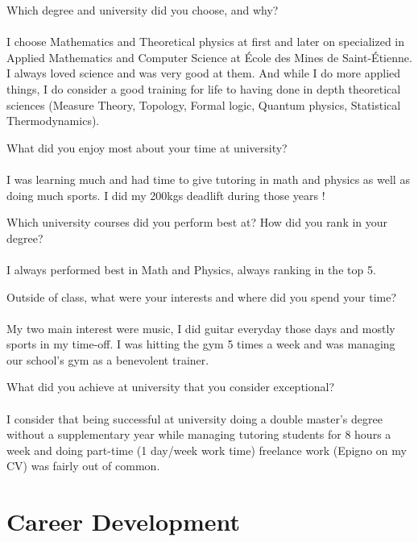 \documentclass{exam}
\begin{document}
\begin{questions}
\question Which degree and university did you choose, and why?
\\~\\
I choose Mathematics and Theoretical physics at first and later on specialized in Applied Mathematics and Computer Science at 
École des Mines de Saint-Étienne. I always loved science and was very good at them. And while I do more applied things, I do consider
a good training for life to having done in depth theoretical sciences (Measure Theory, Topology, Formal logic, Quantum physics, Statistical Thermodynamics).

\question What did you enjoy most about your time at university?
\\~\\
I was learning much and had time to give tutoring in math and physics as well as doing much sports. I did my 200kgs deadlift during those years !

\question Which university courses did you perform best at? How did you rank in your degree?
\\~\\
I always performed best in Math and Physics, always ranking in the top 5.

\question Outside of class, what were your interests and where did you spend your time?
\\~\\
My two main interest were music, I did guitar everyday those days and mostly sports in my time-off. 
I was hitting the gym 5 times a week and was managing our school's gym as a benevolent trainer.

\question What did you achieve at university that you consider exceptional?
\\~\\
I consider that being successful at university doing a double master's degree 
without a supplementary year while managing tutoring students for 8 hours a week and doing part-time (1 day/week work time) freelance work (Epigno on my CV)
was fairly out of common. 
\end{questions}

\section*{Career Development}
\end{document}
